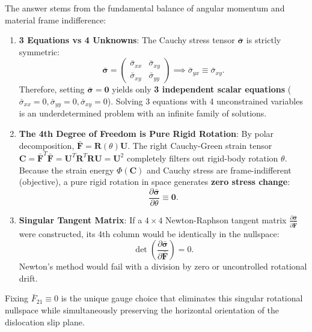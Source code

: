 \documentclass[11pt,a4paper]{article}
\begin{document}
The answer stems from the fundamental balance of angular momentum and material frame indifference:
\begin{enumerate}
    \item \textbf{3 Equations vs 4 Unknowns}:
    The Cauchy stress tensor $\bar{\boldsymbol{\sigma}}$ is strictly symmetric:
    \begin{equation}
    \bar{\boldsymbol{\sigma}} = \begin{pmatrix} \bar{\sigma}_{xx} & \bar{\sigma}_{xy} \\ \bar{\sigma}_{xy} & \bar{\sigma}_{yy} \end{pmatrix} \implies \bar{\sigma}_{yx} \equiv \bar{\sigma}_{xy}.
    \end{equation}
    Therefore, setting $\bar{\boldsymbol{\sigma}} = \mathbf{0}$ yields only \textbf{3 independent scalar equations} ($\bar{\sigma}_{xx} = 0, \bar{\sigma}_{yy} = 0, \bar{\sigma}_{xy} = 0$). Solving 3 equations with 4 unconstrained variables is an underdetermined problem with an infinite family of solutions.
    \item \textbf{The 4th Degree of Freedom is Pure Rigid Rotation}:
    By polar decomposition, $\bar{\mathbf{F}} = \mathbf{R}(\theta)\mathbf{U}$. The right Cauchy-Green strain tensor $\mathbf{C} = \bar{\mathbf{F}}^T \bar{\mathbf{F}} = \mathbf{U}^T \mathbf{R}^T \mathbf{R} \mathbf{U} = \mathbf{U}^2$ completely filters out rigid-body rotation $\theta$. Because the strain energy $\Phi(\mathbf{C})$ and Cauchy stress are frame-indifferent (objective), a pure rigid rotation in space generates \textbf{zero stress change}:
    \begin{equation}
    \frac{\partial \bar{\boldsymbol{\sigma}}}{\partial \theta} \equiv \mathbf{0}.
    \end{equation}
    \item \textbf{Singular Tangent Matrix}:
    If a $4 \times 4$ Newton-Raphson tangent matrix $\frac{\partial \bar{\boldsymbol{\sigma}}}{\partial \bar{\mathbf{F}}}$ were constructed, its 4th column would be identically in the nullspace:
    \begin{equation}
    \det\left( \frac{\partial \bar{\boldsymbol{\sigma}}}{\partial \bar{\mathbf{F}}} \right) = 0.
    \end{equation}
    Newton's method would fail with a division by zero or uncontrolled rotational drift.
\end{enumerate}

Fixing $\bar{F}_{21} \equiv 0$ is the unique gauge choice that eliminates this singular rotational nullspace while simultaneously preserving the horizontal orientation of the dislocation slip plane.
\end{document}
